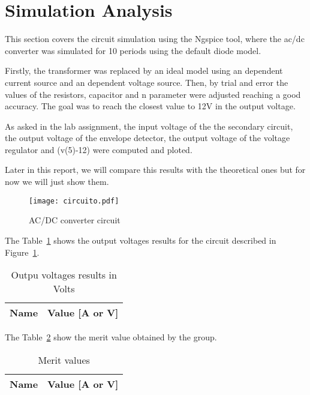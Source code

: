 \section{Simulation Analysis}

\label{sec:simulation}
\par 	This section covers the circuit simulation using the Ngspice tool, where the ac/dc converter was simulated for 10 periods using the default diode model.
\par Firstly, the transformer was replaced by an ideal model using an dependent current source and an dependent voltage source. Then, by trial and error the values of the resistors, capacitor and n parameter were adjusted reaching a good accuracy. The goal was to reach the closest value to 12V in the output voltage.
\par As asked in the lab assignment, the input voltage of the the secondary circuit, the output voltage of the envelope detector, the output voltage of the voltage regulator and (v(5)-12) were computed and ploted.
\par Later in this report, we will compare this results with the theoretical ones but for now we will just show them.


\begin{figure}[!ht] \centering
\texttt{[image: circuito.pdf]}
\caption{AC/DC converter circuit} 
\label{fig:circuitoacdc}
\end{figure}

The Table~\ref{tab:op1} shows the output voltages results for the circuit described in Figure~\ref{fig:circuitoacdc}.

\begin{table}[!ht]
  \centering
  \begin{tabular}{|l|r|}
    \hline    
    {\bf Name} & {\bf Value [A or V]} \\ \hline
    
  \end{tabular}
  \caption{Outpu voltages results in Volts}
  \label{tab:op1}
\end{table}

The Table~\ref{tab:op2} show the merit value obtained by the group.
\begin{table}[!ht]
  \centering
  \begin{tabular}{|l|r|}
    \hline    
    {\bf Name} & {\bf Value [A or V]} \\ \hline
    
  \end{tabular}
  \caption{Merit values}
  \label{tab:op2}
\end{table}

